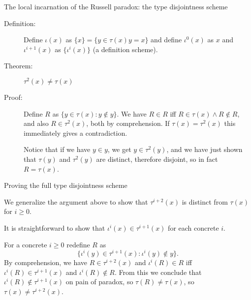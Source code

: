 \documentclass{slides}
\begin{document}
\begin{slide}

{\Large The local incarnation of the Russell paradox:  the type disjointness scheme}

\begin{description}

\item[Definition:]  Define $\iota(x)$ as $\{x\} = \{y \in \tau(x)y=x\}$ and define $\iota^0(x)$ as $x$ and $\iota^{i+1}(x)$ as $\{\iota^i(x)\}$ (a definition scheme).

\item[Theorem:]  $\tau^2(x) \neq \tau(x)$

\item[Proof:]  Define $R$ as $\{y \in \tau(x):y \not\in y\}$.  We have $R \in R$ iff $R \in \tau(x) \wedge R \not\in R$, and also $R \in \tau^2(x)$, both by comprehension.
If $\tau(x) = \tau^2(x)$ this immediately gives a contradiction.

Notice that if we have $y \in y$, we get $y \in \tau^2(y)$, and we have just shown that $\tau(y)$ and $\tau^2(y)$ are distinct, therefore disjoint, so in fact $R = \tau(x)$.

\end{description}


\end{slide}

\begin{slide}


{\Large Proving the full type disjointness scheme}

We generalize the argument above to show that $\tau^{i+2}(x)$ is distinct from $\tau(x)$ for $i \geq 0$.

It is straightforward to show that $\iota^i(x) \in \tau^{i+1}(x)$ for each concrete $i$.

For a concrete $i \geq 0$ redefine $R$ as $$\{\iota^i(y) \in \tau^{i+1}(x):\iota^i(y)\not\in y\}.$$  By comprehension, we have $R \in \tau^{i+2}(x)$ and $\iota^i(R) \in R$ iff $\iota^i(R) \in \tau^{i+1}(x)$ and $\iota^i(R) \not\in R$.
From this we conclude that $\iota^i(R) \not\in \tau^{i+1}(x)$ on pain of paradox, so $\tau(R) \neq \tau(x)$, so $\tau(x) \neq \tau^{i+2}(x)$.
\end{slide}
\end{document}
